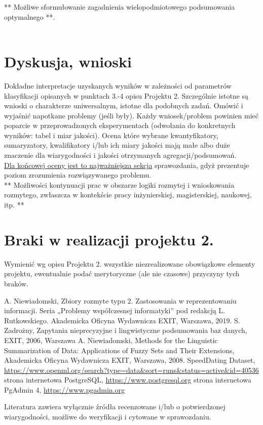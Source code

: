 \documentclass{classrep}
\begin{document}
** Możliwe sformułowanie zagadnienia wielopodmiotowego podsumowania optymalnego **.\\
\\



\section{Dyskusja, wnioski}
Dokładne interpretacje uzyskanych wyników w zależności od parametrów klasyfikacji
opisanych w punktach 3.-4 opisu Projektu 2. 
Szczególnie istotne są wnioski o charakterze uniwersalnym, istotne dla podobnych zadań. 
Omówić i wyjaśnić napotkane problemy (jeśli były). Każdy wniosek/problem powinien mieć poparcie
w przeprowadzonych eksperymentach (odwołania do konkretnych wyników: tabel i miar
jakości). Ocena które wybrane kwantyfikatory, sumaryzatory, kwalifikatory i/lub ich
miary jakości mają małe albo duże znaczenie dla wiarygodności i jakości otrzymanych
agregacji/podsumowań.  \\
\underline{Dla końcowej oceny jest to najważniejsza sekcja} sprawozdania, gdyż prezentuje poziom
zrozumienia rozwiązywanego problemu.\\

** Możliwości kontynuacji prac w obszarze logiki rozmytej i wnioskowania rozmytego, zwłaszcza w kontekście pracy inżynierskiej,
magisterskiej, naukowej, itp. **\\



\section{Braki w realizacji projektu 2.}
Wymienić wg opisu Projektu 2. wszystkie niezrealizowane obowiązkowe elementy projektu, ewentualnie
podać merytoryczne (ale nie czasowe) przyczyny tych braków. 


\begin{thebibliography}{99}
  A. Niewiadomski, Zbiory rozmyte typu 2. Zastosowania w reprezentowaniu informacji.  Seria „Problemy współczesnej informatyki” pod redakcją L. Rutkowskiego. Akademicka Oficyna Wydawnicza EXIT, Warszawa, 2019.
 S. Zadrożny, Zapytania nieprecyzyjne i lingwistyczne podsumowania baz danych, EXIT, 2006, Warszawa
 A. Niewiadomski, Methods for the Linguistic Summarization of Data: Applications of Fuzzy Sets and Their Extensions, Akademicka Oficyna Wydawnicza EXIT, Warszawa, 2008.
 SpeedDating Dataset, \url{https://www.openml.org/search?type=data&sort=runs&status=active&id=40536}
 strona internetowa PostgreSQL, \url{https://www.postgresql.org}
 strona internetowa PgAdmin 4, \url{https://www.pgadmin.org}
\end{thebibliography}

Literatura zawiera wyłącznie źródła recenzowane i/lub o potwierdzonej wiarygodności,
możliwe do weryfikacji i cytowane w sprawozdaniu. 
\end{document}
